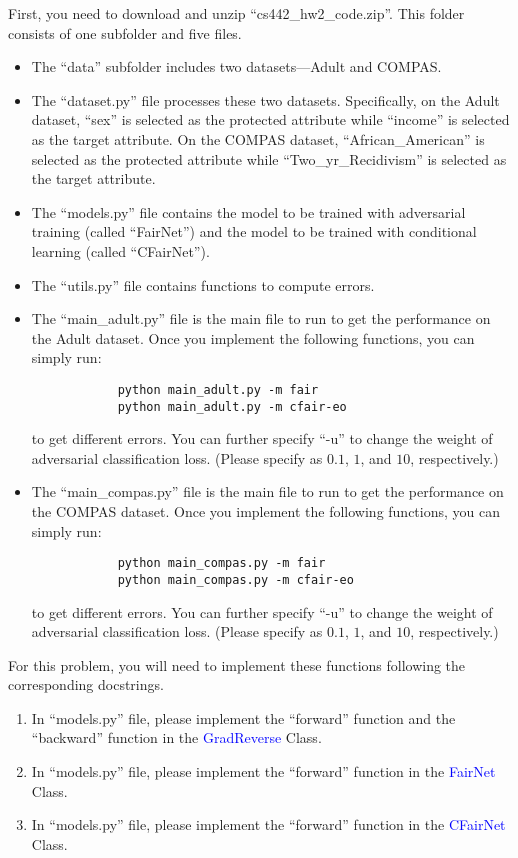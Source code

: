 \documentclass[letterpaper,11pt]{article}
\theoremstyle{definition}
\begin{document}
	First, you need to download and unzip ``cs442\_hw2\_code.zip''. This folder consists of one subfolder and five files.
	\begin{itemize}
		\item The ``data'' subfolder includes two datasets—Adult and COMPAS.
		\item The ``dataset.py'' file processes these two datasets. Specifically, on the Adult dataset, ``sex'' is selected as the protected attribute while ``income'' is selected as the target attribute. On the COMPAS dataset, ``African\_American'' is selected as the protected attribute while ``Two\_yr\_Recidivism'' is selected as the target attribute. 
		\item The ``models.py'' file contains the model to be trained with adversarial training (called ``FairNet'') and the model to be trained with conditional learning (called ``CFairNet'').
		\item The ``utils.py'' file contains functions to compute errors.
		\item The ``main\_adult.py'' file is the main file to run to get the performance on the Adult dataset. Once you implement the following functions, you can simply run: 
		\begin{verbatim}
			python main_adult.py -m fair
			python main_adult.py -m cfair-eo
		\end{verbatim}
		to get different errors. You can further specify ``-u'' to change the weight of adversarial classification loss. (Please specify as $0.1$, $1$, and $10$, respectively.)
		\item The ``main\_compas.py'' file is the main file to run to get the performance on the COMPAS dataset. Once you implement the following functions, you can simply run: 
		\begin{verbatim}
			python main_compas.py -m fair
			python main_compas.py -m cfair-eo
		\end{verbatim}
		to get different errors. You can further specify ``-u'' to change the weight of adversarial classification loss. (Please specify as $0.1$, $1$, and $10$, respectively.)
	\end{itemize}
	
	For this problem, you will need to implement these functions following the corresponding docstrings.
	\begin{enumerate}
		\item In ``models.py'' file, please implement the ``forward'' function and the ``backward'' function in the \textcolor{blue}{GradReverse} Class.
		\item In ``models.py'' file, please implement the ``forward'' function in the \textcolor{blue}{FairNet} Class. 
		\item In ``models.py'' file, please implement the ``forward'' function in the \textcolor{blue}{CFairNet} Class. 
	\end{enumerate}
	
\end{document}
